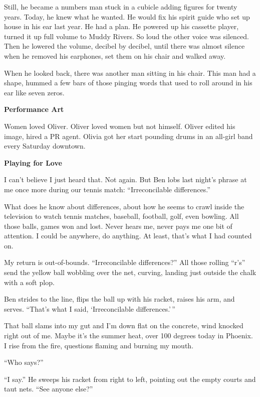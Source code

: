 \documentclass[
]{article}
\begin{document}
Still, he became a numbers man stuck in a cubicle adding figures for
twenty years. Today, he knew what he wanted. He would fix his spirit
guide who set up house in his ear last year. He had a plan. He powered
up his cassette player, turned it up full volume to Muddy Rivers. So
loud the other voice was silenced. Then he lowered the volume, decibel
by decibel, until there was almost silence when he removed his
earphones, set them on his chair and walked away.

When he looked back, there was another man sitting in his chair. This
man had a shape, hummed a few bars of those pinging words that used to
roll around in his ear like seven zeros.

\textbf{\hfill\break
}

\textbf{Performance Art}

Women loved Oliver. Oliver loved women but not himself. Oliver edited
his image, hired a PR agent. Olivia got her start pounding drums in an
all-girl band every Saturday downtown.

\textbf{\hfill\break
}

\textbf{Playing for Love}

I can't believe I just heard that. Not again. But Ben lobs last night's
phrase at me once more during our tennis match: ``Irreconcilable
differences.''

What does he know about differences, about how he seems to crawl inside
the television to watch tennis matches, baseball, football, golf, even
bowling. All those balls, games won and lost. Never hears me, never pays
me one bit of attention. I could be anywhere, do anything. At least,
that's what I had counted on.

My return is out-of-bounds. ``Irreconcilable differences?'' All those
rolling ``r's'' send the yellow ball wobbling over the net, curving,
landing just outside the chalk with a soft plop.

Ben strides to the line, flips the ball up with his racket, raises his
arm, and serves. ``That's what I said, `Irreconcilable differences.'\,''

That ball slams into my gut and I'm down flat on the concrete, wind
knocked right out of me. Maybe it's the summer heat, over 100 degrees
today in Phoenix. I rise from the fire, questions flaming and burning my
mouth.

``Who says?''

``I say.'' He sweeps his racket from right to left, pointing out the
empty courts and taut nets. ``See anyone else?''
\end{document}
